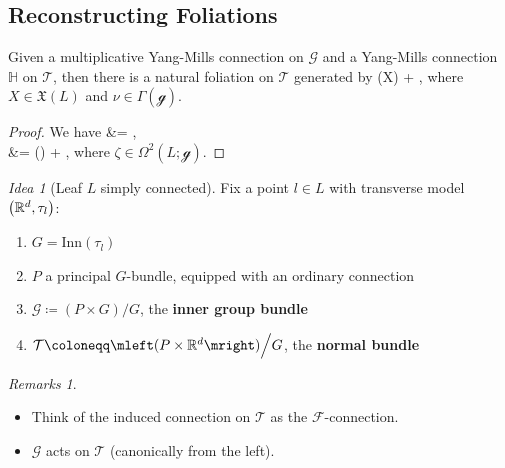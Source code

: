 \documentclass[
aspectratio=3218, 
10pt
]{beamer}
\def\bas#1\eas{\begin{align*}#1\end{align*}}
\theoremstyle{plain}
\theoremstyle{remark}
\newtheorem*{remark}{Remarks}
\newtheorem*{idea}{Idea}
\begin{document}
\subsection{Reconstructing Foliations}
{

\begin{frame}
\begin{theorem}[{[C.\ L.-G., S.-R.\ F.]}]\vspace{.5pt}
Given a multiplicative Yang-Mills connection on $\mathcal{G}$ and a Yang-Mills connection $\mathbb{H}$ on $\mathcal{T}$, then there is a natural foliation on $\mathcal{T}$ generated by 
\bas
\mathbb{H}(X) + \overline{\nu},
\eas
where $X \in \mathfrak{X}(L)$ and $\nu \in \Gamma(\mathcal{g})$.
\end{theorem}
\pause
\begin{proof}
We have
\bas
\mleft[ \mathbb{H}(X), \overline{\nu} \mright]
&=
,
\\
&=
\mleft(\mright)
	+ ,
\eas
where $\zeta \in \Omega^2(L; \mathcal{g})$.	
\end{proof}
\end{frame}

\begin{frame}
\begin{idea}[Leaf $L$ simply connected]
Fix a point $l \in L$ with transverse model $\mleft(\mathbb{R}^d, \tau_l\mright)$:
\begin{enumerate}
	\item $G = \mathrm{Inn}(\tau_l)$
	\pause
	\item $P$ a principal $G$-bundle, equipped with an ordinary connection
	\pause
	\item $\mathcal{G} \coloneqq (P \times G) \Big/ G$, the \textbf{inner group bundle}
	\pause
	\item $\mathcal{T} \coloneqq \mleft(P \times \mathbb{R}^d\mright) \Big/ G$, the \textbf{normal bundle}
\end{enumerate}
\end{idea}

\pause

\begin{remark}
\begin{itemize}
	\item Think of the induced connection on $\mathcal{T}$ as the $\mathcal{F}$-connection.
	\item $\mathcal{G}$ acts on $\mathcal{T}$ (canonically from the left).
\end{itemize}
\end{remark}


\end{frame}}
\end{document}
